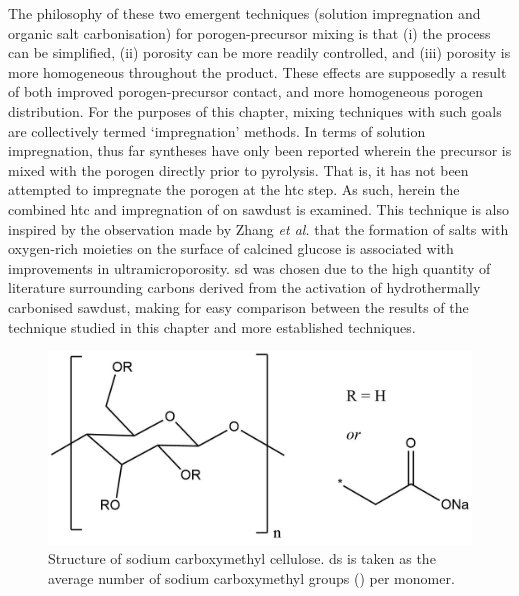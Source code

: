 The philosophy of these two emergent techniques (solution impregnation and organic salt carbonisation) for porogen-precursor mixing is that (i) the process can be simplified, (ii) porosity can be more readily controlled, and (iii) porosity is more homogeneous throughout the product. These effects are supposedly a result of both improved \gls{porogen}-precursor contact, and more homogeneous \gls{porogen} distribution. For the purposes of this chapter, mixing techniques with such goals are collectively termed `impregnation' methods. In terms of solution impregnation, thus far syntheses have only been reported wherein the precursor is mixed with the \gls{porogen} directly prior to pyrolysis.\citep{Botome2017Preparation, Ge2019Highly, Adlak2021Physicochemical, Shi2021Copper, Han2021Mulch, Boujibar2018CO2} That is, it has not been attempted to impregnate the \gls{porogen} at the \gls{htc} step. As such, herein the combined \gls{htc} and impregnation of  on sawdust is examined. This technique is also inspired by the observation made by Zhang \textit{et al.} that the formation of  salts with oxygen-rich moieties on the surface of calcined glucose is associated with improvements in ultramicroporosity.\citep{Zhang2019situ} \acrfull{sd} was chosen due to the high quantity of literature surrounding carbons derived from the activation of hydrothermally carbonised sawdust,\citep{Balahmar2019Pre, Aljumialy2020Porous, Cox2017Ultra, Balahmar2015Generalized} making for easy comparison between the results of the technique studied in this chapter and more established techniques.

\begin{figure}[ht!]
    \centering
    \includegraphics[width=0.8\columnwidth]{4-impregnation/figs/nc_structure.png}
    \caption{Structure of sodium carboxymethyl cellulose. \Acrfull{ds} is taken as the average number of sodium carboxymethyl groups () per monomer.}
    \label{fig:nc_structure}
\end{figure}

